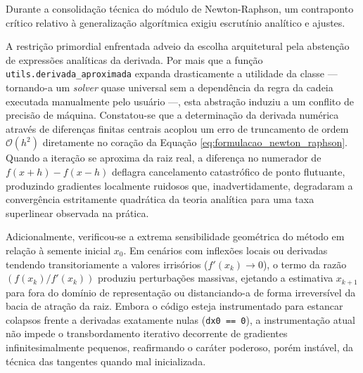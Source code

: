 Durante a consolidação técnica do módulo de Newton-Raphson, um contraponto crítico relativo à generalização algorítmica exigiu escrutínio analítico e ajustes. 

A restrição primordial enfrentada adveio da escolha arquitetural pela abstenção de expressões analíticas da derivada. Por mais que a função \texttt{utils.derivada\_aproximada} expanda drasticamente a utilidade da classe — tornando-a um \textit{solver} quase universal sem a dependência da regra da cadeia executada manualmente pelo usuário —, esta abstração induziu a um conflito de precisão de máquina. Constatou-se que a determinação da derivada numérica através de diferenças finitas centrais acoplou um erro de truncamento de ordem $\mathcal{O}(h^2)$ diretamente no coração da Equação \ref{eq:formulacao_newton_raphson}. Quando a iteração se aproxima da raiz real, a diferença no numerador de $f(x+h) - f(x-h)$ deflagra cancelamento catastrófico de ponto flutuante, produzindo gradientes localmente ruidosos que, inadvertidamente, degradaram a convergência estritamente quadrática da teoria analítica para uma taxa superlinear observada na prática. 

Adicionalmente, verificou-se a extrema sensibilidade geométrica do método em relação à semente inicial $x_0$. Em cenários com inflexões locais ou derivadas tendendo transitoriamente a valores irrisórios ($f'(x_k) \to 0$), o termo da razão $(f(x_k)/f'(x_k))$ produziu perturbações massivas, ejetando a estimativa $x_{k+1}$ para fora do domínio de representação ou distanciando-a de forma irreversível da bacia de atração da raiz. Embora o código esteja instrumentado para estancar colapsos frente a derivadas exatamente nulas (\texttt{dx0 == 0}), a instrumentação atual não impede o transbordamento iterativo decorrente de gradientes infinitesimalmente pequenos, reafirmando o caráter poderoso, porém instável, da técnica das tangentes quando mal inicializada.